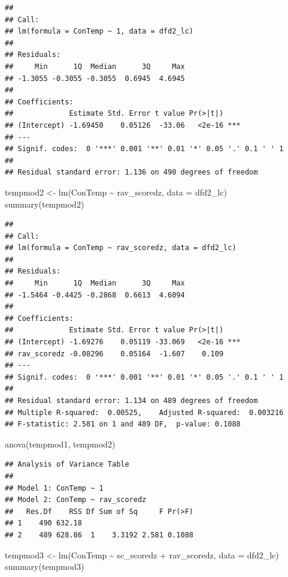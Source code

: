 \documentclass[
]{article}
\newenvironment{Shaded}{\begin{snugshade}}{\end{snugshade}}
\newcommand{\AttributeTok}[1]{\textcolor[rgb]{0.77,0.63,0.00}{#1}}
\newcommand{\FunctionTok}[1]{\textcolor[rgb]{0.00,0.00,0.00}{#1}}
\newcommand{\NormalTok}[1]{#1}
\newcommand{\OtherTok}[1]{\textcolor[rgb]{0.56,0.35,0.01}{#1}}
\newcommand{\SpecialCharTok}[1]{\textcolor[rgb]{0.00,0.00,0.00}{#1}}
\begin{document}
\begin{verbatim}
## 
## Call:
## lm(formula = ConTemp ~ 1, data = dfd2_lc)
## 
## Residuals:
##     Min      1Q  Median      3Q     Max 
## -1.3055 -0.3055 -0.3055  0.6945  4.6945 
## 
## Coefficients:
##             Estimate Std. Error t value Pr(>|t|)    
## (Intercept) -1.69450    0.05126  -33.06   <2e-16 ***
## ---
## Signif. codes:  0 '***' 0.001 '**' 0.01 '*' 0.05 '.' 0.1 ' ' 1
## 
## Residual standard error: 1.136 on 490 degrees of freedom
\end{verbatim}

\begin{Shaded}
\begin{Highlighting}[]
\NormalTok{tempmod2 }\OtherTok{\textless{}{-}} \FunctionTok{lm}\NormalTok{(ConTemp }\SpecialCharTok{\textasciitilde{}}\NormalTok{ rav\_scoredz, }\AttributeTok{data =}\NormalTok{ dfd2\_lc)}
\FunctionTok{summary}\NormalTok{(tempmod2)}
\end{Highlighting}
\end{Shaded}

\begin{verbatim}
## 
## Call:
## lm(formula = ConTemp ~ rav_scoredz, data = dfd2_lc)
## 
## Residuals:
##     Min      1Q  Median      3Q     Max 
## -1.5464 -0.4425 -0.2868  0.6613  4.6094 
## 
## Coefficients:
##             Estimate Std. Error t value Pr(>|t|)    
## (Intercept) -1.69276    0.05119 -33.069   <2e-16 ***
## rav_scoredz -0.08296    0.05164  -1.607    0.109    
## ---
## Signif. codes:  0 '***' 0.001 '**' 0.01 '*' 0.05 '.' 0.1 ' ' 1
## 
## Residual standard error: 1.134 on 489 degrees of freedom
## Multiple R-squared:  0.00525,    Adjusted R-squared:  0.003216 
## F-statistic: 2.581 on 1 and 489 DF,  p-value: 0.1088
\end{verbatim}

\begin{Shaded}
\begin{Highlighting}[]
\FunctionTok{anova}\NormalTok{(tempmod1, tempmod2)}
\end{Highlighting}
\end{Shaded}

\begin{verbatim}
## Analysis of Variance Table
## 
## Model 1: ConTemp ~ 1
## Model 2: ConTemp ~ rav_scoredz
##   Res.Df    RSS Df Sum of Sq     F Pr(>F)
## 1    490 632.18                          
## 2    489 628.86  1    3.3192 2.581 0.1088
\end{verbatim}

\begin{Shaded}
\begin{Highlighting}[]
\NormalTok{tempmod3 }\OtherTok{\textless{}{-}} \FunctionTok{lm}\NormalTok{(ConTemp }\SpecialCharTok{\textasciitilde{}}\NormalTok{ sc\_scoredz }\SpecialCharTok{+}\NormalTok{ rav\_scoredz, }\AttributeTok{data =}\NormalTok{ dfd2\_lc)}
\FunctionTok{summary}\NormalTok{(tempmod3)}
\end{Highlighting}
\end{Shaded}
\end{document}
